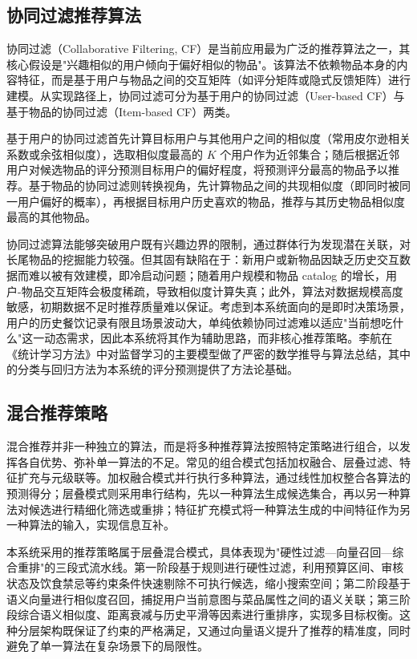 \subsection{协同过滤推荐算法}

协同过滤（Collaborative Filtering, CF）是当前应用最为广泛的推荐算法之一，其核心假设是"兴趣相似的用户倾向于偏好相似的物品"。该算法不依赖物品本身的内容特征，而是基于用户与物品之间的交互矩阵（如评分矩阵或隐式反馈矩阵）进行建模。从实现路径上，协同过滤可分为基于用户的协同过滤（User-based CF）与基于物品的协同过滤（Item-based CF）两类。

基于用户的协同过滤首先计算目标用户与其他用户之间的相似度（常用皮尔逊相关系数或余弦相似度），选取相似度最高的 $K$ 个用户作为近邻集合；随后根据近邻用户对候选物品的评分预测目标用户的偏好程度，将预测评分最高的物品予以推荐。基于物品的协同过滤则转换视角，先计算物品之间的共现相似度（即同时被同一用户偏好的概率），再根据目标用户历史喜欢的物品，推荐与其历史物品相似度最高的其他物品。

协同过滤算法能够突破用户既有兴趣边界的限制，通过群体行为发现潜在关联，对长尾物品的挖掘能力较强。但其固有缺陷在于：新用户或新物品因缺乏历史交互数据而难以被有效建模，即冷启动问题；随着用户规模和物品 catalog 的增长，用户-物品交互矩阵会极度稀疏，导致相似度计算失真；此外，算法对数据规模高度敏感，初期数据不足时推荐质量难以保证。考虑到本系统面向的是即时决策场景，用户的历史餐饮记录有限且场景波动大，单纯依赖协同过滤难以适应"当前想吃什么"这一动态需求，因此本系统将其作为辅助思路，而非核心推荐策略。李航在《统计学习方法》中对监督学习的主要模型做了严密的数学推导与算法总结，其中的分类与回归方法为本系统的评分预测提供了方法论基础\super{[18]}。

\subsection{混合推荐策略}

混合推荐并非一种独立的算法，而是将多种推荐算法按照特定策略进行组合，以发挥各自优势、弥补单一算法的不足。常见的组合模式包括加权融合、层叠过滤、特征扩充与元级联等。加权融合模式并行执行多种算法，通过线性加权整合各算法的预测得分；层叠模式则采用串行结构，先以一种算法生成候选集合，再以另一种算法对候选进行精细化筛选或重排；特征扩充模式将一种算法生成的中间特征作为另一种算法的输入，实现信息互补。

本系统采用的推荐策略属于层叠混合模式，具体表现为"硬性过滤---向量召回---综合重排"的三段式流水线。第一阶段基于规则进行硬性过滤，利用预算区间、审核状态及饮食禁忌等约束条件快速剔除不可执行候选，缩小搜索空间；第二阶段基于语义向量进行相似度召回，捕捉用户当前意图与菜品属性之间的语义关联；第三阶段综合语义相似度、距离衰减与历史平滑等因素进行重排序，实现多目标权衡。这种分层架构既保证了约束的严格满足，又通过向量语义提升了推荐的精准度，同时避免了单一算法在复杂场景下的局限性。

